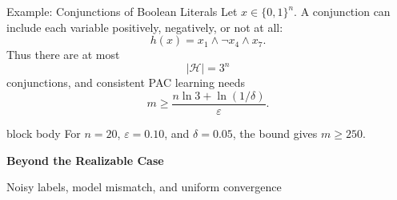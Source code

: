 \documentclass[aspectratio=169,10pt]{beamer}
\newcommand{\Hc}{\mathcal{H}}
\newcommand{\eps}{\varepsilon}
\newcommand{\SectionSlide}[2]{%
  \begin{frame}
    \centering
    \vfill
    {\color{slideorange}\fontsize{29}{34}\selectfont\bfseries #1\par}
    \vspace{0.38cm}
    {\color{midgray}\fontsize{16}{21}\selectfont #2\par}
    \vfill
  \end{frame}
}
\begin{document}
\begin{frame}[t]{Example: Conjunctions of Boolean Literals}
  \vspace{0.12cm}
  {\normalsize Let $x\in\{0,1\}^n$. A conjunction can include each variable positively, negatively, or not at all:}
  \[
    h(x)=x_1\wedge \neg x_4\wedge x_7.
  \]
  \vspace{-0.05cm}
  {\normalsize Thus there are at most}
  \[
    |\Hc|=3^n
  \]
  {\normalsize conjunctions, and consistent PAC learning needs}
  \[
    m\ge \frac{n\ln 3+\ln(1/\delta)}{\eps}.
  \]
  \vspace{0.12cm}
  \begin{beamercolorbox}[rounded=true,sep=0.22cm,wd=0.90\linewidth,center]{block body}
    \centering
    {\normalsize For $n=20$, $\eps=0.10$, and $\delta=0.05$, the bound gives $m\ge 250$.}
  \end{beamercolorbox}
\end{frame}

\SectionSlide{Beyond the Realizable Case}{Noisy labels, model mismatch, and uniform convergence}
\end{document}

